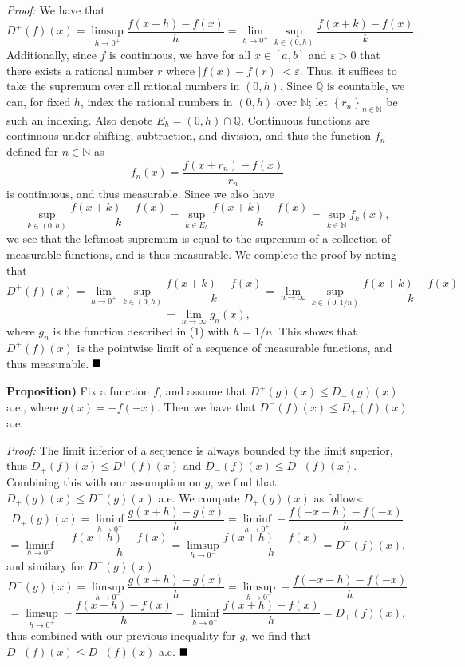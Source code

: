 \documentclass[12pt]{article}
\newcommand{\N}{\ensuremath{\mathbb{N}}}
\newcommand{\Q}{\ensuremath{\mathbb{Q}}}
\newcommand{\e}{\ensuremath{\varepsilon}}
\newcommand{\braceb}[1]{\left\{#1\right\}}
\newcommand{\vertb}[1]{\left\vert#1\right\vert}
\newcommand{\proof}{\textit{Proof: }}
\newcommand{\done}{\ensuremath{\strut\hfill\blacksquare}}
\begin{document}
\proof
We have that
\[
	D^+(f)(x)
	= \limsup_{h \to 0^+} \frac{f(x + h) - f(x)}{h}
	= \lim_{h \to 0^+} \sup_{k \in (0,h)} \frac{f(x + k) - f(x)}{k}.
\]
Additionally, since \( f \) is continuous, we have for all
\( x \in [a,b] \) and \( \e > 0 \) that there exists a rational number
\( r \) where \( \vertb{f(x) - f(r)} < \e \).
Thus, it suffices to take the supremum over all rational numbers in
\( (0,h) \).
Since \( \Q \) is countable, we can, for fixed \( h \), index the
rational numbers in \( (0,h) \) over \( \N \); let
\( \braceb{r_n}_{n \in \N} \) be such an indexing.
Also denote \( E_h = (0,h) \cap \Q \).
Continuous functions are continuous under shifting, subtraction, and division,
and thus the function \( f_n \) defined for \( n \in \N \) as
\[
	f_n(x) = \frac{f(x + r_n) - f(x)}{r_n}
\]
is continuous, and thus measurable.
Since we also have
\begin{equation}
	\sup_{k \in (0,h)} \frac{f(x + k) - f(x)}{k}
	= \sup_{k \in E_h} \frac{f(x + k) - f(x)}{k}
	= \sup_{k \in \N} f_k(x),
\end{equation}
we see that the leftmost supremum is equal to the supremum of a collection of
measurable functions, and is thus measurable.
We complete the proof by noting that
\[
	D^+(f)(x)
	= \lim_{h \to 0^+} \sup_{k \in (0,h)} \frac{f(x + k) - f(x)}{k}
	= \lim_{n \to \infty} \sup_{k \in (0,1/n)} \frac{f(x + k) - f(x)}{k}
\]
\[
	= \lim_{n \to \infty} g_n(x),
\]
where \( g_n \) is the function described in (1) with \( h = 1/n \).
This shows that \( D^+(f)(x) \) is the pointwise limit of a sequence of
measurable functions, and thus measurable.
\done

\textbf{Proposition)}
Fix a function \( f \), and assume that \( D^+(g)(x) \leq D_-(g)(x) \)
a.e., where \( g(x) = -f(-x) \).
Then we have that \( D^-(f)(x) \leq D_+(f)(x) \) a.e.

\proof
The limit inferior of a sequence is always bounded by the limit superior,
thus \( D_+(f)(x) \leq D^+(f)(x) \) and \( D_-(f)(x) \leq D^-(f)(x) \).
Combining this with our assumption on \( g \), we find that
\( D_+(g)(x) \leq D^-(g)(x) \) a.e.
We compute \( D_+(g)(x) \) as follows:
\[
	D_+(g)(x)
	= \liminf_{h \to 0^+} \frac{g(x + h) - g(x)}{h}
	= \liminf_{h \to 0^+} -\frac{f(-x - h) - f(-x)}{h}
\]
\[
	= \liminf_{h \to 0^-} -\frac{f(x + h) - f(x)}{h}
	= \limsup_{h \to 0^-} \frac{f(x + h) - f(x)}{h}
	= D^-(f)(x),
\]
and similary for \( D^-(g)(x) \):
\[
	D^-(g)(x)
	= \limsup_{h \to 0^-} \frac{g(x + h) - g(x)}{h}
	= \limsup_{h \to 0^-} -\frac{f(-x - h) - f(-x)}{h}
\]
\[
	= \limsup_{h \to 0^+} -\frac{f(x + h) - f(x)}{h}
	= \liminf_{h \to 0^+} \frac{f(x + h) - f(x)}{h}
	= D_+(f)(x),
\]
thus combined with our previous inequality for \( g \), we find that
\( D^-(f)(x) \leq D_+(f)(x) \) a.e.
\done

{}
\end{document}
